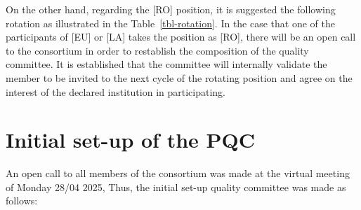 \documentclass[
  12pt,
  oneside]{book}
\begin{document}
On the other hand, regarding the {[}RO{]} position, it is suggested the
following rotation as illustrated in the Table~\ref{tbl-rotation}. In
the case that one of the participants of {[}EU{]} or {[}LA{]} takes the
position as {[}RO{]}, there will be an open call to the consortium in
order to restablish the composition of the quality committee. It is
established that the committee will internally validate the member to be
invited to the next cycle of the rotating position and agree on the
interest of the declared institution in participating.

\begin{table}

\caption{\label{tbl-rotation}Planification of rotation position in the
quality comittee}


\end{table}%

\section{Initial set-up of the PQC}\label{initial-set-up-of-the-pqc}

An open call to all members of the consortium was made at the virtual
meeting of Monday 28/04 2025, Thus, the initial set-up quality committee
was made as follows:
\end{document}
